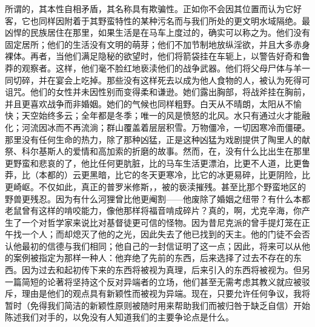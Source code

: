所谓的，其本性自相矛盾，其名称具有欺骗性。正如你不会因其位置而认为它好客，它也同样因附着于其野蛮特性的某种污名而与我们所处的更文明水域隔绝。最凶悍的民族居住在那里，如果生活是在马车上度过的，确实可以称之为。他们没有固定居所；他们的生活没有文明的萌芽；他们不加节制地放纵淫欲，并且大多赤身裸体。再者，当他们满足隐秘的欲望时，他们将箭袋挂在车轭上，以警告好奇和鲁莽的观察者。这样，他们毫不脸红地亵渎他们的战争武器。他们将父母尸体与羊一同切碎，并在宴会上吃掉。那些没有这样死去以成为他人食物的人，被认为死得可诅咒。他们的女性并未因性别而变得柔和谦逊。她们露出胸部，将战斧挂在胸前，并且更喜欢战争而非婚姻。她们的气候也同样粗野。白天从不晴朗，太阳从不愉快；天空始终多云；全年都是冬季；唯一的风是愤怒的北风。水只有通过火才能融化；河流因冰而不再流淌；群山覆盖着层层积雪。万物僵冷，一切因寒冷而僵硬。那里没有任何生命的热力，除了那种凶猛，正是这种凶猛为戏剧提供了陶里人的献祭、科尔基斯人的爱情和高加索的折磨的故事。然而，在，没有什么比出生在那里更野蛮和悲哀的了，他比任何更肮脏，比的马车生活更漂泊，比更不人道，比更鲁莽，比（本都的）云更黑暗，比它的冬天更寒冷，比它的冰更易碎，比更阴险，比更崎岖。不仅如此，真正的普罗米修斯，，被的亵渎摧残。甚至比那个野蛮地区的野兽更残忍。因为有什么河狸曾比他更阉割——他废除了婚姻之纽带？有什么本都老鼠曾有这样的啃咬能力，像他那样将福音啃成碎片？真的，啊，尤克辛海，你产生了一个对哲学家来说比对基督徒更可信的怪物。因为昔尼克派的曾手提灯笼在正午找一个人；而却熄灭了他的之光，因此失去了他已找到的天主。他的门徒不会否认他最初的信德与我们相同；他自己的一封信证明了这一点；因此，将来可以从他的案例被指定为那样一种人：他弃绝了先前的东西，后来选择了过去不存在的东西。因为过去和起初传下来的东西将被视为真理，后来引入的东西将被视为。但另一篇简短的论著将坚持这个反对异端者的立场，他们甚至无需考虑其教义就应被驳斥，理由是他们的观点具有新颖性而被视为异端。现在，只要允许任何争议，我将暂时（免得我们简洁的新颖性原则被随时用来帮助我们而被归咎于缺乏自信）开始陈述我们对手的，以免没有人知道我们的主要争论点是什么。\par


\subsection{    }

